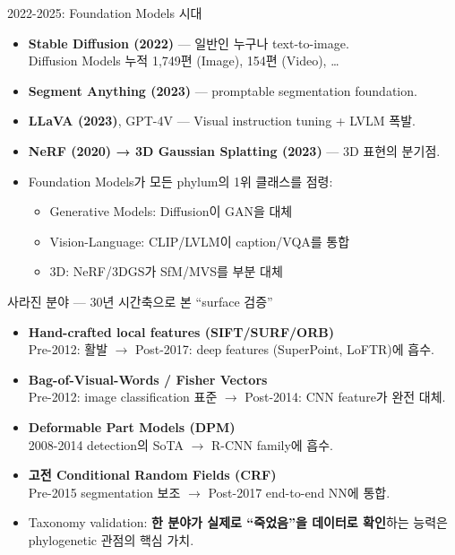 \documentclass[aspectratio=169,t]{beamer}
\newcommand{\hot}[1]{\textcolor{accentorange}{\textbf{#1}}}
\newcommand{\cool}[1]{\textcolor{accentblue}{\textbf{#1}}}
\begin{document}
\begin{frame}{2022-2025: Foundation Models 시대}
\begin{itemize}
  \item \hot{Stable Diffusion (2022)} — 일반인 누구나 text-to-image. \\
        Diffusion Models 누적 1{,}749편 (Image), 154편 (Video), …
  \item \hot{Segment Anything (2023)} — promptable segmentation foundation.
  \item \hot{LLaVA (2023)}, GPT-4V — Visual instruction tuning + LVLM 폭발.
  \item \hot{NeRF (2020) → 3D Gaussian Splatting (2023)} — 3D 표현의 분기점.
  \item Foundation Models가 모든 phylum의 1위 클래스를 점령:
  \begin{itemize}
    \item Generative Models: Diffusion이 GAN을 대체
    \item Vision-Language: CLIP/LVLM이 caption/VQA를 통합
    \item 3D: NeRF/3DGS가 SfM/MVS를 부분 대체
  \end{itemize}
\end{itemize}
\end{frame}

\begin{frame}{사라진 분야 — 30년 시간축으로 본 ``surface 검증''}
\begin{itemize}
  \item \hot{Hand-crafted local features (SIFT/SURF/ORB)} \\
        Pre-2012: 활발 $\to$ Post-2017: deep features (SuperPoint, LoFTR)에 흡수.
  \item \hot{Bag-of-Visual-Words / Fisher Vectors} \\
        Pre-2012: image classification 표준 $\to$ Post-2014: CNN feature가 완전 대체.
  \item \hot{Deformable Part Models (DPM)} \\
        2008-2014 detection의 SoTA $\to$ R-CNN family에 흡수.
  \item \hot{고전 Conditional Random Fields (CRF)} \\
        Pre-2015 segmentation 보조 $\to$ Post-2017 end-to-end NN에 통합.
  \item Taxonomy validation: \cool{한 분야가 실제로 ``죽었음''을 데이터로 확인}하는 능력은 phylogenetic 관점의 핵심 가치.
\end{itemize}
\end{frame}
\end{document}
